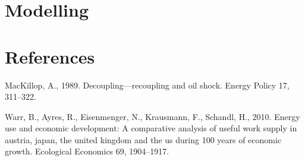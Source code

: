 \documentclass[]{elsarticle} %
\begin{document}
\hypertarget{modelling}{%
\section{Modelling}\label{modelling}}

\hypertarget{references}{%
\section*{References}\label{references}}

\hypertarget{refs}{}
\leavevmode\hypertarget{ref-Mackillop1989decoupling}{}%
MacKillop, A., 1989. Decoupling---recoupling and oil shock. Energy
Policy 17, 311--322.

\leavevmode\hypertarget{ref-Warr2010energy}{}%
Warr, B., Ayres, R., Eisenmenger, N., Krausmann, F., Schandl, H., 2010.
Energy use and economic development: A comparative analysis of useful
work supply in austria, japan, the united kingdom and the us during 100
years of economic growth. Ecological Economics 69, 1904--1917.
\end{document}
